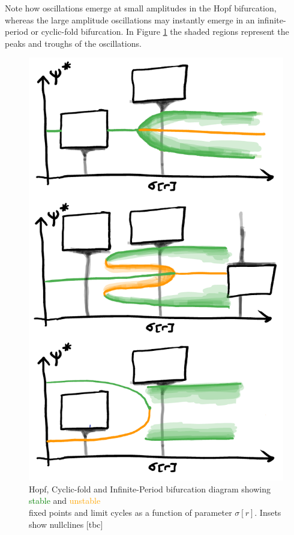 Note how oscillations emerge at small amplitudes in the Hopf bifurcation,
whereas the large amplitude oscillations may instantly emerge in an infinite-period
or cyclic-fold bifurcation. In Figure \ref{fig:limitcycles} the shaded regions
represent the peaks and troughs of the oscillations.
\begin{figure}[H]
\centering{}
\captionsetup{justification=centering}
\includegraphics[scale=0.35]{figures/limitcycles}
\caption{Hopf, Cyclic-fold and Infinite-Period bifurcation diagram showing
\textcolor{Green}{stable} and \textcolor{orange}{unstable}\\ fixed points
and limit cycles as a function of parameter $\sigma[r]$.
Insets show nullclines [tbc]}
\label{fig:limitcycles}
\end{figure}
